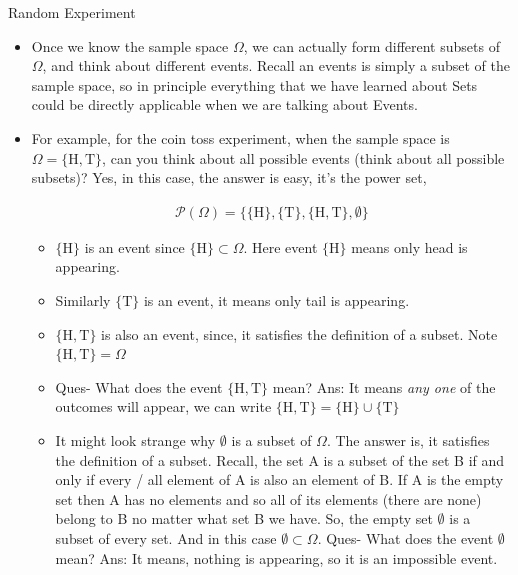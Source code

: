 \documentclass[8pt, usepdftitle = false]{beamer}
\begin{document}
\begin{frame}[allowframebreaks]{Random Experiment}
\begin{itemize}
\begin{figure}
\caption{Throwing dices, tossing a single coin and sampling from a population, all are examples of random experiment!}
\end{figure}




\item Once we know the sample space $\Omega$, we can actually form different subsets of $\Omega$, and think about different \alert{events}. Recall an \alert{events} is simply a subset of the sample space, so in principle everything that we have learned about Sets could be directly applicable when we are talking about Events. 

\framebreak

\item For example, for the coin toss experiment, when the sample space is $\Omega = \{\textrm{H}, \textrm{T}\}$, can you think about \alert{all possible events} (think about all possible subsets)? Yes, in this case, the answer is easy, it's the power set,


\begin{align*}
\mathcal{P}(\Omega) = \{  \{\textrm{H}\}, \{\textrm{T}\}, \{\textrm{H}, \textrm{T} \}, \emptyset  \}
\end{align*}


\begin{itemize}
\item $\{\textrm{H}\}$ is an event since $\{\textrm{H}\} \subset \Omega$. Here event $\{\textrm{H}\}$ means only head is appearing.
\item Similarly $\{\textrm{T}\}$ is an event, it means only tail is appearing.
\item $ \{\textrm{H}, \textrm{T}\} $ is also an event, since, it satisfies the definition of a subset. Note $\{\textrm{H}, \textrm{T} \} = \Omega$
\item {\color{red} Ques-} What does the event $ \{\textrm{H}, \textrm{T}\} $ mean? Ans: It means \emph{any one} of the outcomes will appear, we can write $\{\textrm{H}, \textrm{T} \}  = \{\textrm{H}\} \cup \{\textrm{T}\} $
\item It might look strange why $\emptyset$ is a subset of $\Omega$. The answer is, it satisfies the definition of a subset. Recall, the set A is a subset of the set B if and only if every / all element of A is also an element of B. If A is the empty set then A has no elements and so all of its elements (there are none) belong to B no matter what set B we have. So, the empty set $\emptyset$ is a subset of every set. And in this case $\emptyset \subset \Omega$. {\color{red} Ques-} \alert{What does the event $\emptyset$ mean?} Ans: It means, nothing is appearing, so it is an impossible event. 

\end{itemize}








\end{itemize}
\end{frame}
\end{document}
